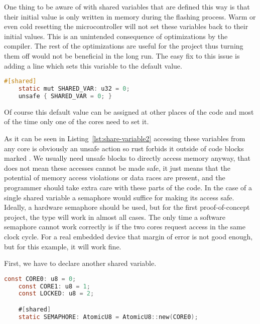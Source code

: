 One thing to be aware of with shared variables that are defined this way is that their initial value is only written in memory during the flashing process. Warm or even cold resetting the microcontroller will not set these variables back to their initial values. This is an unintended consequence of optimizations by the compiler. The rest of the optimizations are useful for the project thus turning them off would not be beneficial in the long run. The easy fix to this issue is adding a line which sets this variable to the default value.

\begin{lstlisting}[language=C,frame=single,float=!ht,label={lst:shared-variable2},caption={Shared Variable Example With Default Value}]
    #[shared]
    static mut SHARED_VAR: u32 = 0;
    unsafe { SHARED_VAR = 0; }
\end{lstlisting}

Of course this default value can be assigned at other places of the code and most of the time only one of the cores need to set it.

As it can be seen in Listing~\ref{lst:share-variable2} accessing these variables from any core is obviously an unsafe action so rust forbids it outside of code blocks marked . We usually need unsafe blocks to directly access memory anyway, that does not mean these accesses cannot be made safe, it just means that the potential of memory access violations or data races are present, and the programmer should take extra care with these parts of the code. In the case of a single shared variable a semaphore would suffice for making its access safe. Ideally, a hardware semaphore should be used, but for the first proof-of-concept project, the  type will work in almost all cases. The only time a software semaphore cannot work correctly is if the two cores request access in the same clock cycle. For a real embedded device that margin of error is not good enough, but for this example, it will work fine.

First, we have to declare another shared variable.

\begin{lstlisting}[language=C,frame=single,float=!ht,label={lst:sw-semaphore1},caption={Software Semaphore Variables}]
    const CORE0: u8 = 0;
    const CORE1: u8 = 1;
    const LOCKED: u8 = 2;

    #[shared]
    static SEMAPHORE: AtomicU8 = AtomicU8::new(CORE0);
\end{lstlisting}

